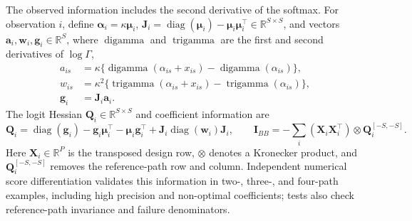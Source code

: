 \documentclass[11pt]{article}
\begin{document}
The observed information includes the second derivative of the softmax. For observation \(i\), define \(\boldsymbol\alpha_i=\kappa\boldsymbol\mu_i\), \(\mathbf J_i=\operatorname{diag}(\boldsymbol\mu_i)-\boldsymbol\mu_i\boldsymbol\mu_i^\top\in\mathbb R^{S\times S}\), and vectors \(\mathbf a_i,\mathbf w_i,\mathbf g_i\in\mathbb R^S\), where \(\operatorname{digamma}\) and \(\operatorname{trigamma}\) are the first and second derivatives of \(\log\Gamma\), \begin{equation}\begin{aligned}a_{is}&=\kappa\{\operatorname{digamma}(\alpha_{is}+x_{is})-\operatorname{digamma}(\alpha_{is})\},\\w_{is}&=\kappa^2\{\operatorname{trigamma}(\alpha_{is}+x_{is})-\operatorname{trigamma}(\alpha_{is})\},\\\mathbf g_i&=\mathbf J_i\mathbf a_i.\end{aligned}\end{equation} The logit Hessian \(\mathbf Q_i\in\mathbb R^{S\times S}\) and coefficient information are \begin{equation}\mathbf Q_i=\operatorname{diag}(\mathbf g_i)-\mathbf g_i\boldsymbol\mu_i^\top-\boldsymbol\mu_i\mathbf g_i^\top+\mathbf J_i\operatorname{diag}(\mathbf w_i)\mathbf J_i,\qquad\mathbf I_{BB}=-\sum_i(\mathbf X_i\mathbf X_i^\top)\otimes\mathbf Q_i^{[-S,-S]}.\end{equation} Here \(\mathbf X_i\in\mathbb R^P\) is the transposed design row, \(\otimes\) denotes a Kronecker product, and \(\mathbf Q_i^{[-S,-S]}\) removes the reference-path row and column. Independent numerical score differentiation validates this information in two-, three-, and four-path examples, including high precision and non-optimal coefficients; tests also check reference-path invariance and failure denominators.
\end{document}
